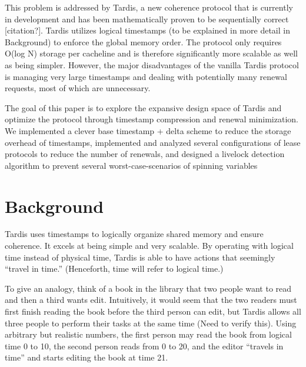 \documentclass[12pt]{article}
\begin{document}
This problem is addressed by Tardis, a new coherence protocol that is currently in development and has been mathematically proven to be sequentially correct [citation?]. Tardis utilizes logical timestamps (to be explained in more detail in Background) to enforce the global memory order. The protocol only requires O(log N) storage per cacheline and is therefore significantly more scalable as well as being simpler. However, the major disadvantages of the vanilla Tardis protocol is managing very large timestamps and dealing with potentially many renewal requests, most of which are unnecessary. 

The goal of this paper is to explore the expansive design space of Tardis and optimize the protocol through timestamp compression and renewal minimization. We implemented a clever base timestamp + delta scheme to reduce the storage overhead of timestamps, implemented and analyzed several configurations of lease protocols to reduce the number of renewals, and designed a livelock detection algorithm to prevent several worst-case-scenarios of spinning variables

\section{Background}
Tardis uses timestamps to logically organize shared memory and ensure coherence. It excels at being simple and very scalable. By operating with logical time instead of physical time, Tardis is able to have actions that seemingly “travel in time.” (Henceforth, time will refer to logical time.)

To give an analogy, think of a book in the library that two people want to read and then a third wants edit. Intuitively, it would seem that the two readers must first finish reading the book before the third person can edit, but Tardis allows all three people to perform their tasks at the same time (Need to verify this).  Using arbitrary but realistic numbers, the first person may read the book from logical time 0 to 10, the second person reads from 0 to 20, and the editor “travels in time” and starts editing the book at time 21.
\end{document}
